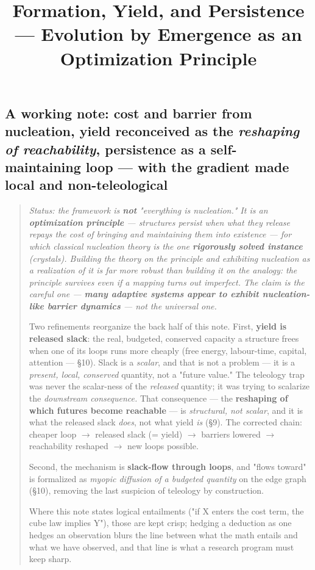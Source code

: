 \documentclass{article}
\title{Formation, Yield, and Persistence --- Evolution by Emergence as an Optimization Principle}
\author{}
\date{}
\begin{document}
\maketitle

\subsection*{A working note: cost and barrier from nucleation, yield reconceived as the \textit{reshaping of reachability}, persistence as a self-maintaining loop --- with the gradient made local and non-teleological}

\begin{quote}
\itshape
Status: the framework is \textbf{not} "everything is nucleation." It is an \textbf{optimization principle} --- structures persist when what they release repays the cost of bringing and maintaining them into existence --- for which classical nucleation theory is the one \textbf{rigorously solved instance} (crystals). Building the theory on the principle and exhibiting nucleation as a realization of it is far more robust than building it on the analogy: the principle survives even if a mapping turns out imperfect. The claim is the careful one --- \textbf{many adaptive systems appear to exhibit nucleation-like barrier dynamics} --- not the universal one.

Two refinements reorganize the back half of this note. First, \textbf{yield is released slack}: the real, budgeted, conserved capacity a structure frees when one of its loops runs more cheaply (free energy, labour-time, capital, attention --- §10). Slack is a \textit{scalar}, and that is not a problem --- it is a \textit{present, local, conserved} quantity, not a "future value." The teleology trap was never the scalar-ness of the \textit{released} quantity; it was trying to scalarize the \textit{downstream consequence.} That consequence --- the \textbf{reshaping of which futures become reachable} --- is \textit{structural, not scalar}, and it is what the released slack \textit{does}, not what yield \textit{is} (§9). The corrected chain: cheaper loop $\rightarrow$ released slack (= yield) $\rightarrow$ barriers lowered $\rightarrow$ reachability reshaped $\rightarrow$ new loops possible.

Second, the mechanism is \textbf{slack-flow through loops}, and "flows toward" is formalized as \textit{myopic diffusion of a budgeted quantity} on the edge graph (§10), removing the last suspicion of teleology by construction.

Where this note states logical entailments ("if X enters the cost term, the cube law implies Y"), those are kept crisp; hedging a deduction as one hedges an observation blurs the line between what the math entails and what we have observed, and that line is what a research program must keep sharp.
\end{quote}
\end{document}
